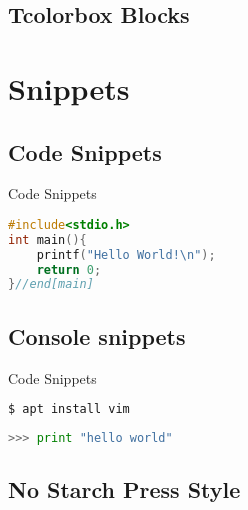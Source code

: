 \documentclass[aspectratio=169,tokyonightday,12pt]{darkbeamer}
\begin{document}
\subsection{Tcolorbox Blocks}

\section{Snippets}
\subsection{Code Snippets}

\begin{frame}[fragile]{Code Snippets}
\begin{lstlisting}[language=c, caption=C snippet]
#include<stdio.h>
int main(){
	printf("Hello World!\n");
	return 0;
}//end[main]
\end{lstlisting}
\end{frame}

\subsection{Console snippets}

\begin{frame}[fragile]{Code Snippets}
\begin{lstlisting}[language=bash, caption=Debian snippet]
$ apt install vim 
\end{lstlisting}

\begin{lstlisting}[language=python, caption=Python snippet]
>>> print "hello world"
\end{lstlisting}
\end{frame}

\subsection{No Starch Press Style}
\end{document}
